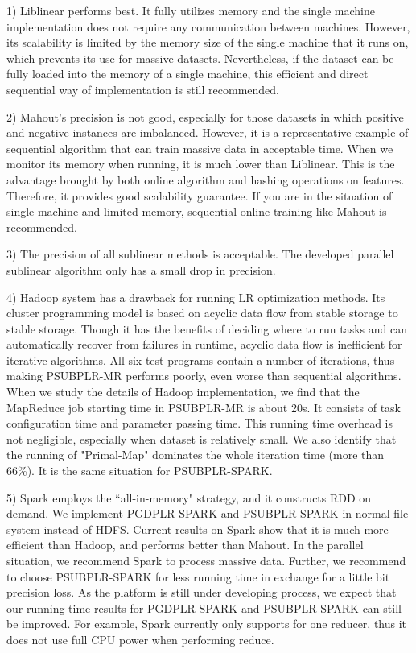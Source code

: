 \documentclass[10pt, conference, compsocconf]{IEEEtran}
\begin{document}
1) Liblinear performs best. It fully utilizes memory and the single machine implementation does not require any communication between machines.
          However, its scalability is limited by the memory size of the single machine that it runs on, which prevents its use for massive datasets.
          Nevertheless, if the dataset can be fully loaded into the memory of a single machine, this efficient and direct sequential way of implementation is still recommended.

2) Mahout's precision is not good, especially for those datasets in which positive and negative instances are imbalanced.
          However, it is a representative example of sequential algorithm that can train massive data in acceptable time.
          When we monitor its memory when running, it is much lower than Liblinear. This is the advantage brought by both online algorithm and hashing operations on features.
          Therefore, it provides good scalability guarantee. If you are in the situation of single machine and limited memory, sequential online training like Mahout is recommended.

3) The precision of all sublinear methods is acceptable. The developed parallel sublinear algorithm only has a small drop in precision.

4) Hadoop system has a drawback for running LR optimization methods. Its cluster programming model is based on acyclic data flow from stable storage to stable storage.
          Though it has the benefits of deciding where to run tasks and can automatically recover from failures in runtime, acyclic data flow is inefficient for iterative algorithms.
          All six test programs contain a number of iterations, thus making PSUBPLR-MR performs poorly, even worse than sequential algorithms.
          When we study the details of Hadoop implementation, we find that the MapReduce job starting time in PSUBPLR-MR is about 20s. It consists of task configuration time and parameter passing time.
          This running time overhead is not negligible, especially when dataset is relatively small.
          We also identify that the running of "Primal-Map" dominates the whole iteration time (more than 66\%). It is the same situation for PSUBPLR-SPARK.

5) Spark employs the ``all-in-memory" strategy, and it constructs RDD on demand. We implement PGDPLR-SPARK and PSUBPLR-SPARK in normal file system instead of HDFS.
          Current results on Spark show that it is much more efficient than Hadoop, and performs better than Mahout.
          In the parallel situation, we recommend Spark to process massive data. Further, we recommend to choose PSUBPLR-SPARK for less running time in exchange for a little bit precision loss.
          As the platform is still under developing process, we expect that our running time results for PGDPLR-SPARK and PSUBPLR-SPARK can still be improved.
          For example, Spark currently only supports for one reducer, thus it does not use full CPU power when performing reduce.
\end{document}
